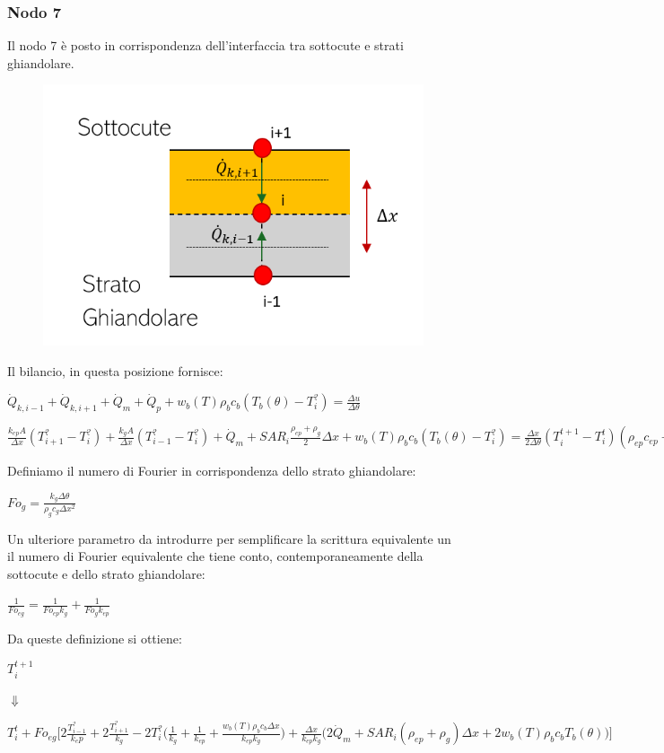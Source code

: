 \subsubsection*{Nodo 7}
Il nodo 7 è posto in corrispondenza dell'interfaccia tra sottocute e strati ghiandolare.
\begin{figure}[H]
    \centering
    \includegraphics[width=.6\textwidth]{Immagini/Nodi/nodo7.png} 
    \label{nodo7}
\end{figure}
\noindent
Il bilancio, in questa posizione fornisce:
\begin{center}
	$ \Dot{Q} _{k, i-1} +\Dot{Q} _{k, i+1}+ \Dot{Q} _{m} +\Dot{Q} _{p}+ w_b (T) \rho _b c_b (T_b(\theta)-T_i ^?)= \frac{\Delta u}{\Delta \theta} $
\end{center}
\vspace{0.15cm}
\begin{center}
	$ \frac{k_{ep} A }{\Delta x}(T_{i+1} ^? - T_i ^? ) + \frac{k_g A }{\Delta x}(T_{i-1} ^? - T_i ^? )+ \Dot{Q} _{m} + SAR_i \frac{\rho _{ep} + \rho _g}{2} \Delta x + w_b (T) \rho _b c_b (T_b(\theta)-T_i ^?) = \frac{\Delta x}{ 2 \Delta \theta}(T_i ^{t+1} - T_i ^t ) (\rho _{ep} c_{ep} + \rho _{g} c_{g} )$
\end{center}
Definiamo il numero di Fourier in corrispondenza dello strato ghiandolare:
\begin{center}
	$Fo_{g}= \frac{k_{g} \Delta \theta}{\rho _{g} c_{g} \Delta x^2}$
\end{center}
Un ulteriore parametro da introdurre per semplificare la scrittura equivalente un il numero di Fourier equivalente che tiene conto, contemporaneamente della sottocute e dello strato ghiandolare:
\begin{center}
	$\frac{1}{Fo_{eg}}= \frac{1}{Fo_{ep}k_g}+ \frac{1}{Fo_{g}k_{ep}}$
\end{center}
Da queste definizione si ottiene:
\begin{center}
	$T_i ^{t+1} $
\end{center}
\begin{center}
	$\Downarrow$
\end{center}
\begin{center}
	$T_i ^t + Fo_{eg} \Bigg[ 2\frac{T_{i-1} ^?}{k_ep} + 2\frac{T_{i+1} ^?}{k_{g}}- 2T_i ^? \Big(\frac{1}{k_g} + \frac{1}{k_{ep}}+ \frac{ w_b (T) \rho _b c_b \Delta x }{k_{ep}k_g} \Big) +  \frac{\Delta x }{k_{ep}k_g} \Big(2\Dot{Q} _{m} +  SAR_i (\rho _{ep}+ \rho _g) \Delta x + 2w_b (T) \rho _b c_b T_b(\theta)\Big) \Bigg]$
\end{center}



